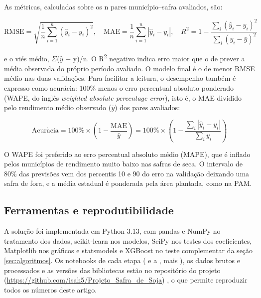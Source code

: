 \documentclass[
	article,			%
	11pt,				%
	oneside,			%
	a4paper,			%
	english,			%
	brazil,				%
	sumario=tradicional
	]{abntex2}
\begin{document}
As métricas, calculadas sobre os n pares município--safra avaliados, são:

\begin{equation}
\mathrm{RMSE} = \sqrt{\frac{1}{n}\sum_{i=1}^{n}(\hat{y}_i - y_i)^2}, \quad \mathrm{MAE} = \frac{1}{n}\sum_{i=1}^{n}|\hat{y}_i - y_i|, \quad R^2 = 1 - \frac{\sum_i(\hat{y}_i - y_i)^2}{\sum_i(y_i - \bar{y})^2}
\end{equation}

e o viés médio, $\Sigma$($\hat{y}$ $-$ y)/n. O R\textsuperscript{2} negativo indica erro maior que o de prever a média observada do próprio período avaliado. O modelo final é o de menor RMSE médio nas duas validações. Para facilitar a leitura, o desempenho também é expresso como acurácia: 100\% menos o erro percentual absoluto ponderado (WAPE, do inglês \emph{weighted absolute percentage error}), isto é, o MAE dividido pelo rendimento médio observado ($\bar{y}$) dos pares avaliados:

\begin{equation}
\mathrm{Acur\acute{a}cia} = 100\% \times \left(1 - \frac{\mathrm{MAE}}{\bar{y}}\right) = 100\% \times \left(1 - \frac{\sum_i|\hat{y}_i - y_i|}{\sum_i y_i}\right)
\end{equation}

O WAPE foi preferido ao erro percentual absoluto médio (MAPE), que é inflado pelos municípios de rendimento muito baixo nas safras de seca. O intervalo de 80\% das previsões vem dos percentis 10 e 90 do erro na validação deixando uma safra de fora, e a média estadual é ponderada pela área plantada, como na PAM.

\subsection{Ferramentas e reprodutibilidade}\label{sec:ferramentas}

A solução foi implementada em Python 3.13, com pandas e NumPy no tratamento dos dados, scikit-learn \cite{pedregosa2011} nos modelos, SciPy nos testes dos coeficientes, Matplotlib nos gráficos e statsmodels e XGBoost no teste complementar da seção \ref{sec:algoritmos}. Os notebooks de cada etapa ( e  a , mais ), os dados brutos e processados e as versões das bibliotecas estão no repositório do projeto (\url{https://github.com/isah5/Projeto_Safra_de_Soja}) \cite{repositorio}, o que permite reproduzir todos os números deste artigo.
\end{document}
